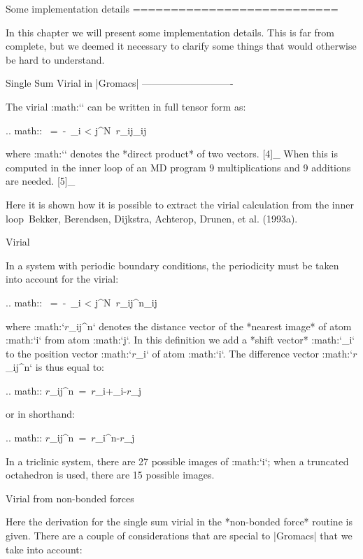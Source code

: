 Some implementation details
===========================

In this chapter we will present some implementation details. This is far
from complete, but we deemed it necessary to clarify some things that
would otherwise be hard to understand.

Single Sum Virial in |Gromacs|
----------------------------

The virial :math:`\Xi` can be written in full tensor form as:

.. math:: \Xi~=~-~\sum_{i < j}^N~{\mbox{\boldmath ${r}$}}_ij_ij

where :math:`\otimes` denotes the *direct product* of two vectors. [4]_
When this is computed in the inner loop of an MD program 9
multiplications and 9 additions are needed. [5]_

Here it is shown how it is possible to extract the virial calculation
from the inner loop Bekker, Berendsen, Dijkstra, Achterop, Drunen, et
al. (1993a).

Virial
~~~~~~

In a system with periodic boundary conditions, the periodicity must be
taken into account for the virial:

.. math:: \Xi~=~-~\sum_{i < j}^{N}~{\mbox{\boldmath ${r}$}}_{ij}^n_ij

where :math:`{\mbox{\boldmath ${r}$}}_{ij}^n` denotes the distance
vector of the *nearest image* of atom :math:`i` from atom :math:`j`. In
this definition we add a *shift vector* :math:`\delta_i` to the position
vector :math:`{\mbox{\boldmath ${r}$}}_i` of atom :math:`i`. The
difference vector :math:`{\mbox{\boldmath ${r}$}}_{ij}^n` is thus equal
to:

.. math:: {\mbox{\boldmath ${r}$}}_{ij}^n~=~{\mbox{\boldmath ${r}$}}_i+\delta_i-{\mbox{\boldmath ${r}$}}_j

or in shorthand:

.. math:: {\mbox{\boldmath ${r}$}}_{ij}^n~=~{\mbox{\boldmath ${r}$}}_i^n-{\mbox{\boldmath ${r}$}}_j

In a triclinic system, there are 27 possible images of :math:`i`; when
a truncated octahedron is used, there are 15 possible images.

Virial from non-bonded forces
~~~~~~~~~~~~~~~~~~~~~~~~~~~~~

Here the derivation for the single sum virial in the *non-bonded force*
routine is given. There are a couple of considerations that are special
to |Gromacs| that we take into account:

